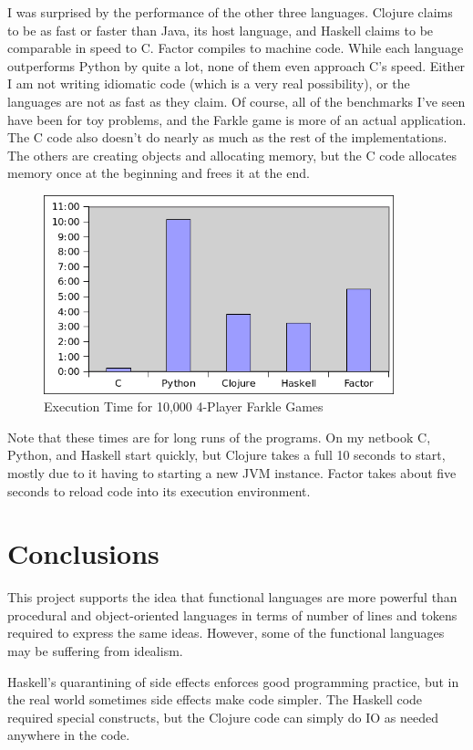 \documentclass{article}
\begin{document}
I was surprised by the performance of the other three languages.  Clojure claims
to be as fast or faster than Java, its host language, and Haskell claims to be
comparable in speed to C.  Factor compiles to machine code.  While each language
outperforms Python by quite a lot, none of them even approach C's speed.  Either
I am not writing idiomatic code (which is a very real possibility), or the
languages are not as fast as they claim.  Of course, all of the benchmarks I've
seen have been for toy problems, and the Farkle game is more of an actual
application.  The C code also doesn't do nearly as much as the rest of the
implementations.  The others are creating objects and allocating memory, but the
C code allocates memory once at the beginning and frees it at the end.

\begin{figure}[h]
    \centering
    \includegraphics[width=4in]{graphs/performance-comparison.png}
    \caption{Execution Time for 10,000 4-Player Farkle Games \label{fig:performance}}
\end{figure}

Note that these times are for long runs of the programs.  On my netbook C,
Python, and Haskell start quickly, but Clojure takes a full 10
seconds to start, mostly due to it having to starting a new JVM instance.  Factor
takes about five seconds to reload code into its execution environment.

\section{Conclusions}
This project supports the idea that functional languages are more powerful than
procedural and object-oriented languages in terms of number of lines and tokens
required to express the same ideas.  However, some of the functional languages
may be suffering from idealism.

Haskell's quarantining of side effects enforces good programming practice, but
in the real world sometimes side effects make code simpler.  The Haskell code
required special constructs, but the Clojure code can simply do IO as needed
anywhere in the code.
\end{document}
